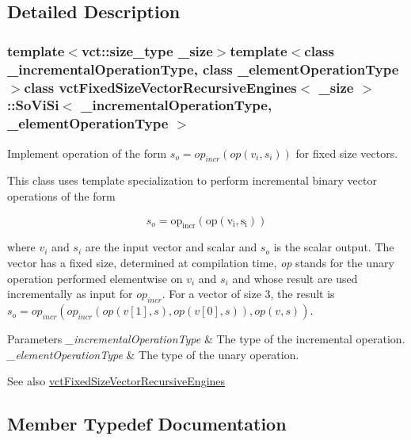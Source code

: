 \subsection{Detailed Description}
\subsubsection*{template$<$vct\+::size\+\_\+type \+\_\+size$>$template$<$class \+\_\+incremental\+Operation\+Type, class \+\_\+element\+Operation\+Type$>$class vct\+Fixed\+Size\+Vector\+Recursive\+Engines$<$ \+\_\+size $>$\+::\+So\+Vi\+Si$<$ \+\_\+incremental\+Operation\+Type, \+\_\+element\+Operation\+Type $>$}

Implement operation of the form $s_o = op_{incr}(op(v_i, s_i))$ for fixed size vectors. 

This class uses template specialization to perform incremental binary vector operations of the form

\[ s_o = \mathrm{op_{incr}(\mathrm{op}(v_i, s_i))} \]

where $v_i$ and $s_i$ are the input vector and scalar and $s_o$ is the scalar output. The vector has a fixed size, determined at compilation time, {\itshape op} stands for the unary operation performed elementwise on $v_i$ and $s_i$ and whose result are used incrementally as input for $op_{incr}$. For a vector of size 3, the result is $s_o = op_{incr}(op_{incr}(op(v[1], s), op(v[0], s)), op(v, s))$.


\begin{DoxyParams}{Parameters}
{\em \+\_\+incremental\+Operation\+Type} & The type of the incremental operation.\\
\hline
{\em \+\_\+element\+Operation\+Type} & The type of the unary operation.\\
\hline
\end{DoxyParams}
\begin{DoxySeeAlso}{See also}
\hyperlink{classvct_fixed_size_vector_recursive_engines}{vct\+Fixed\+Size\+Vector\+Recursive\+Engines} 
\end{DoxySeeAlso}


\subsection{Member Typedef Documentation}
\hypertarget{classvct_fixed_size_vector_recursive_engines_1_1_so_vi_si_a44d1ef1068c419fc926e4fd821d08402}{}
